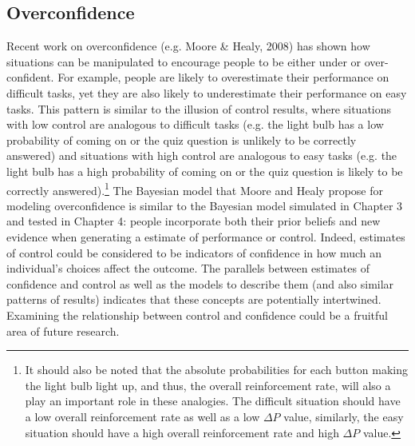 \documentclass[USenglish,letterpaper,12pt,extrafontsizes,oneside,onecolumn,final]{memoir}
\newcommand{\deltap}{$\Delta P$}
\begin{document}
\subsection{Overconfidence}
Recent work on overconfidence (e.g. Moore \& Healy, 2008) has shown how situations can be manipulated to encourage people to be either under or over-confident.  For example, people are likely to overestimate their performance on difficult tasks, yet they are also likely to underestimate their performance on easy tasks.  This pattern is similar to the illusion of control results, where situations with low control are analogous to difficult tasks (e.g. the light bulb has a low probability of coming on or the quiz question is unlikely to be correctly answered) and situations with high control are analogous to easy tasks (e.g. the light bulb has a high probability of coming on or the quiz question is likely to be correctly answered).\footnote{It should also be noted that the absolute probabilities for each button making the light bulb light up, and thus, the overall reinforcement rate, will also a play an important role in these analogies. The difficult situation should have a low overall reinforcement rate as well as a low \deltap \xspace value, similarly, the easy situation should have a high overall reinforcement rate and high \deltap \xspace value.} The Bayesian model that Moore and Healy propose for modeling overconfidence is similar to the Bayesian model simulated in Chapter 3 and tested in Chapter 4: people incorporate both their prior beliefs and new evidence when generating a estimate of performance or control.  Indeed, estimates of control could be considered to be indicators of confidence in how much an individual's choices affect the outcome.  The parallels between estimates of confidence and control as well as the models to describe them (and also similar patterns of results) indicates that these concepts are potentially intertwined.  Examining the relationship between control and confidence could be a fruitful area of future research.
\end{document}
